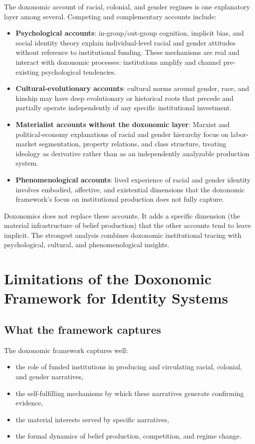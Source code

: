 The doxonomic account of racial, colonial, and gender regimes is one explanatory layer among several.
Competing and complementary accounts include:
\begin{itemize}[nosep]
  \item \textbf{Psychological accounts}: in-group/out-group cognition, implicit bias, and social identity theory explain individual-level racial and gender attitudes without reference to institutional funding.
  These mechanisms are real and interact with doxonomic processes: institutions amplify and channel pre-existing psychological tendencies.
  \item \textbf{Cultural-evolutionary accounts}: cultural norms around gender, race, and kinship may have deep evolutionary or historical roots that precede and partially operate independently of any specific institutional investment.
  \item \textbf{Materialist accounts without the doxonomic layer}: Marxist and political-economy explanations of racial and gender hierarchy focus on labor-market segmentation, property relations, and class structure, treating ideology as derivative rather than as an independently analyzable production system.
  \item \textbf{Phenomenological accounts}: lived experience of racial and gender identity involves embodied, affective, and existential dimensions that the doxonomic framework's focus on institutional production does not fully capture.
\end{itemize}
Doxonomics does not replace these accounts.
It adds a specific dimension (the material infrastructure of belief production) that the other accounts tend to leave implicit.
The strongest analysis combines doxonomic institutional tracing with psychological, cultural, and phenomenological insights.

\section{Limitations of the Doxonomic Framework for Identity Systems}
\label{sec:ch24b-limitations}

\subsection{What the framework captures}

The doxonomic framework captures well:
\begin{itemize}[nosep]
  \item the role of funded institutions in producing and circulating racial, colonial, and gender narratives,
  \item the self-fulfilling mechanisms by which these narratives generate confirming evidence,
  \item the material interests served by specific narratives,
  \item the formal dynamics of belief production, competition, and regime change.
\end{itemize}

